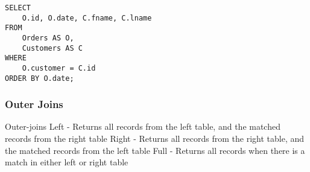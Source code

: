 \documentclass{article}
\begin{document}
\begin{lstlisting}[frame=single]  
SELECT 
    O.id, O.date, C.fname, C.lname
FROM
    Orders AS O,
    Customers AS C
WHERE
    O.customer = C.id
ORDER BY O.date;
\end{lstlisting} 
%
%                




















\subsubsection*{Outer Joins}

\begin{outline}
     
                
        \1 Outer-joins
                \2 Left - Returns all records from the left table, and the
matched records from the right table
                \2 Right - Returns all records from the right table, and
the matched records from the left table
                \2 Full - Returns all records when there is a match in either
left or right table
\end{outline}


  
  



 
\end{document}
